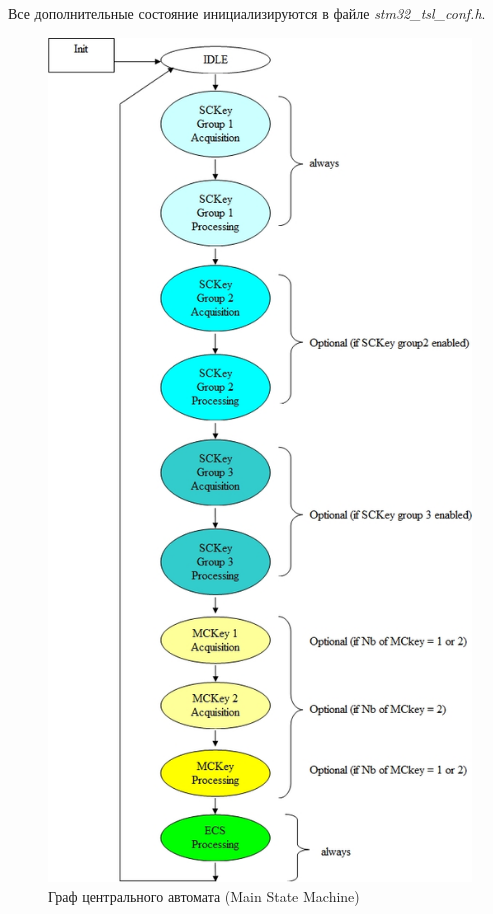 Все дополнительные состояние инициализируются в файле \textit{stm32\_tsl\_conf.h}.
\begin{figure}[h!]
\begin{center}
\includegraphics[scale=0.45]{Image/62.jpg} 
\end{center}
\caption{Граф центрального автомата (Main State Machine)}
\end{figure}


